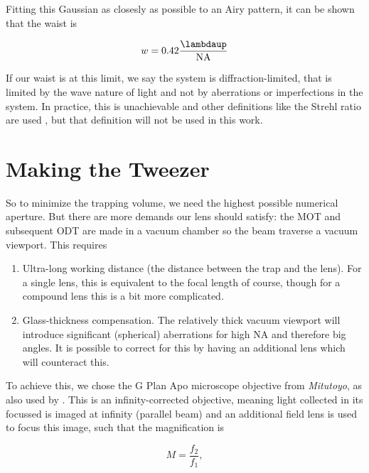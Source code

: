 Fitting this Gaussian as closesly as possible to an Airy pattern, it can be shown that the waist is \cite{Zhang2007}

\begin{equation}\label{GaussianAiryFit}
    w = 0.42 \frac{\lambdaup}{\text{NA}}
\end{equation}
 
If our waist is at this limit, we say the system is diffraction-limited, that is limited by the wave nature of light and not by aberrations or imperfections in the system. 
In practice, this is unachievable and other definitions like the Strehl ratio are used \cite{Sortais2007}, but that definition will not be used in this work. 

\section{Making the Tweezer}

So to minimize the trapping volume, we need the highest possible numerical aperture. But there are more demands our lens should satisfy: the \ac{MOT} and subsequent \ac{ODT} are made in a vacuum chamber so the beam traverse a vacuum viewport. This requires

\begin{enumerate}
    \item Ultra-long working distance (the distance between the trap and the lens). For a single lens, this is equivalent to the focal length of course, though for a compound lens this is a bit more complicated. 
    
    \item Glass-thickness compensation. The relatively thick vacuum viewport will introduce significant (spherical) aberrations for high NA and therefore big angles. It is possible to correct for this by having an additional lens which will counteract this.
\end{enumerate}

To achieve this, we chose the G Plan Apo microscope objective from \textit{Mitutoyo}, as also used by \cite{Manuel2016,Ebadi2021}. 
This is an infinity-corrected objective, meaning light collected in its focussed is imaged at infinity (parallel beam) and an additional field lens is used to focus this image, such that the magnification is 

\begin{equation}\label{eq:InfinityMagnification}
    M = \frac{f_2}{f_1},
\end{equation}

